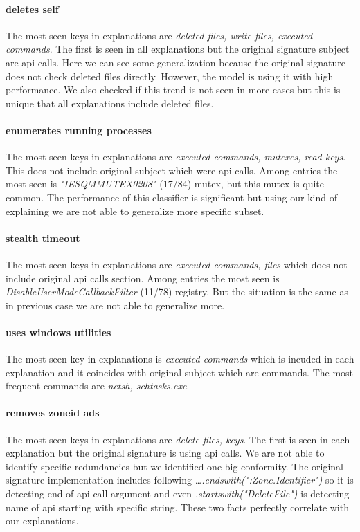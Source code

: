 \paragraph{deletes self}
The most seen keys in explanations are \emph{deleted files, write files, executed commands}. The first is seen in all explanations but the original signature subject are api calls. Here we can see some generalization because the original signature does not check deleted files directly. However, the model is using it with high performance. We also checked if this trend is not seen in more cases but this is unique that all explanations include deleted files.

\paragraph{enumerates running processes}
The most seen keys in explanations are \emph{executed commands, mutexes, read keys}. This does not include original subject which were api calls.  Among entries the most seen is \emph{"IESQMMUTEX0208"} (17/84) mutex, but this mutex is quite common. The performance of this classifier is significant but using our kind of explaining we are not able to generalize more specific subset.

\paragraph{stealth timeout}
The most seen keys in explanations are \emph{executed commands, files} which does not include original api calls section. Among entries the most seen is \emph{DisableUserModeCallbackFilter} (11/78) registry. But the situation is the same as in previous case we are not able to generalize more.

\paragraph{uses windows utilities}
The most seen key in explanations is \emph{executed commands} which is incuded in each explanation and it coincides with original subject which are commands. The most frequent commands are \emph{netsh, schtasks.exe}.

\paragraph{removes zoneid ads}
The most seen keys in explanations are \emph{delete files, keys}. The first is seen in each explanation but the original signature is using api calls. We are not able to identify specific redundancies but we identified one big conformity. The original signature implementation includes following \emph{\dots .endswith(":Zone.Identifier")} so it is detecting end of api call argument and even \emph{.startswith("DeleteFile")} is detecting name of api starting with specific string. These two facts perfectly correlate with our explanations.

